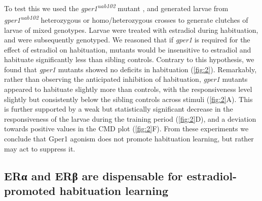 \documentclass[9.5pt,lineno]{RandlettLab_elife}
\begin{document}
{To test this we used the \emph{gper1\textsuperscript{uab102}} mutant \citep{Romano2017-ep}, and generated larvae from \emph{gper1\textsuperscript{uab102}} heterozygous or homo/heterozygous crosses to generate clutches of larvae of mixed genotypes. 
Larvae were treated with estradiol during habituation, and were subsequently genotyped. 
We reasoned that if \emph{gper1} is required for the effect of estradiol on habituation, mutants would be insensitive to estradiol and habituate significantly less than sibling controls. 
Contrary to this hypothesis, we found that \emph{gper1} mutants showed no deficits in habituation (\autoref{fig:2}). 
Remarkably, rather than observing the anticipated inhibition of habituation, \emph{gper1} mutants appeared to habituate slightly more than controls, with the responsiveness level slightly but consistently below the sibling controls across stimuli (\autoref{fig:2}A). 
This is further supported by a weak but statistically significant decrease in the responsiveness of the larvae during the training period (\autoref{fig:2}D), and a deviation towards positive values in the CMD plot (\autoref{fig:2}F). 
From these experiments we conclude that Gper1 agonism does not promote habituation learning, but rather may act to suppress it.  


\subsection{ERα and ERβ are dispensable for estradiol-promoted habituation learning}

}
\end{document}
